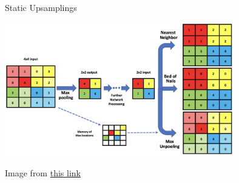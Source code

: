 \documentclass[serif, aspectratio=169]{beamer}
\begin{document}
\begin{frame}{Static Upsamplings}
 
    \begin{center}
        \includegraphics[width=0.75\textwidth]{pic/Static Upsampling.png}
    \end{center}
        \tiny{Image from \href{https://mriquestions.com/upsampling.html}{this link}}


\end{frame}
\end{document}
